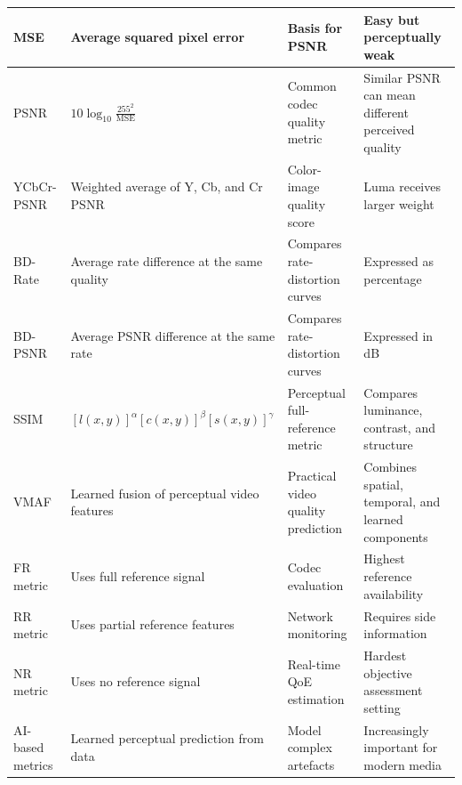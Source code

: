 \begin{center}
\begin{tabular}{|l|l|l|l|}
MSE & Average squared pixel error & Basis for PSNR & Easy but perceptually weak \\ \hline
PSNR & $10\log_{10}\frac{255^2}{\text{MSE}}$ & Common codec quality metric & Similar PSNR can mean different perceived quality \\ \hline
YCbCr-PSNR & Weighted average of Y, Cb, and Cr PSNR & Color-image quality score & Luma receives larger weight \\ \hline
BD-Rate & Average rate difference at the same quality & Compares rate-distortion curves & Expressed as percentage \\ \hline
BD-PSNR & Average PSNR difference at the same rate & Compares rate-distortion curves & Expressed in dB \\ \hline
SSIM & $[l(x,y)]^\alpha[c(x,y)]^\beta[s(x,y)]^\gamma$ & Perceptual full-reference metric & Compares luminance, contrast, and structure \\ \hline
VMAF & Learned fusion of perceptual video features & Practical video quality prediction & Combines spatial, temporal, and learned components \\ \hline
FR metric & Uses full reference signal & Codec evaluation & Highest reference availability \\ \hline
RR metric & Uses partial reference features & Network monitoring & Requires side information \\ \hline
NR metric & Uses no reference signal & Real-time QoE estimation & Hardest objective assessment setting \\ \hline
AI-based metrics & Learned perceptual prediction from data & Model complex artefacts & Increasingly important for modern media \\ \hline
\end{tabular}
\end{center}

